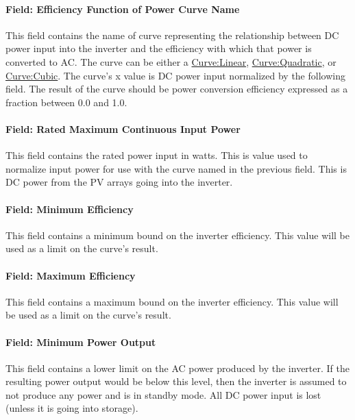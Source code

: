 \paragraph{Field: Efficiency Function of Power Curve Name}\label{field-efficiency-function-of-power-curve-name}

This field contains the name of curve representing the relationship between DC power input into the inverter and the efficiency with which that power is converted to AC. The curve can be either a \hyperref[curvelinear]{Curve:Linear}, \hyperref[curvequadratic]{Curve:Quadratic}, or \hyperref[curvecubic]{Curve:Cubic}. The curve's x value is DC power input normalized by the following field. The result of the curve should be power conversion efficiency expressed as a fraction between 0.0 and 1.0.

\paragraph{Field: Rated Maximum Continuous Input Power}\label{field-rated-maximum-continuous-input-power}

This field contains the rated power input in watts. This is value used to normalize input power for use with the curve named in the previous field. This is DC power from the PV arrays going into the inverter.

\paragraph{Field: Minimum Efficiency}\label{field-minimum-efficiency}

This field contains a minimum bound on the inverter efficiency. This value will be used as a limit on the curve's result.

\paragraph{Field: Maximum Efficiency}\label{field-maximum-efficiency}

This field contains a maximum bound on the inverter efficiency. This value will be used as a limit on the curve's result.

\paragraph{Field: Minimum Power Output}\label{field-minimum-power-output}

This field contains a lower limit on the AC power produced by the inverter. If the resulting power output would be below this level, then the inverter is assumed to not produce any power and is in standby mode. All DC power input is lost (unless it is going into storage).

